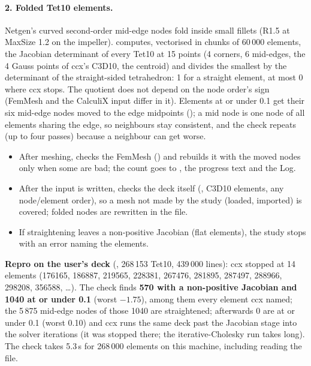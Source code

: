 \paragraph{2. Folded Tet10 elements.} Netgen's curved second-order mid-edge nodes fold inside small fillets (R1.5 at
MaxSize 1.2 on the impeller).  computes, vectorised in chunks of 60\,000 elements, the
Jacobian determinant of every Tet10 at 15 points (4 corners, 6 mid-edges, the 4 Gauss points of ccx's C3D10, the centroid) and
divides the smallest by the determinant of the straight-sided tetrahedron: 1 for a straight element, at most 0 where ccx stops.
The quotient does not depend on the node order's sign (FemMesh and the CalculiX input differ in it). Elements at or under 0.1
get their six mid-edge nodes moved to the edge midpoints (); a mid node is one node of all elements
sharing the edge, so neighbours stay consistent, and the check repeats (up to four passes) because a neighbour can get worse.
\begin{itemize}
  \item After meshing,  checks the FemMesh () and rebuilds it with the moved
        nodes only when some are bad; the count goes to , the progress text and the Log.
  \item After the input is written,  checks the deck itself (, C3D10 elements, any
        node/element order), so a mesh not made by the study (loaded, imported) is covered; folded nodes are rewritten in the file.
  \item If straightening leaves a non-positive Jacobian (flat elements), the study stops with an error naming the elements.
\end{itemize}
\textbf{Repro on the user's deck} (, 268\,153 Tet10, 439\,000 lines): ccx stopped at 14 elements
(176165, 186887, 219565, 228381, 267476, 281895, 287497, 288966, 298208, 356588, \ldots). The check finds \textbf{570 with a
non-positive Jacobian and 1040 at or under 0.1} (worst $-1.75$), among them every element ccx named; the 5\,875 mid-edge nodes
of those 1040 are straightened; afterwards 0 are at or under 0.1 (worst 0.10) and ccx runs the same deck past the Jacobian
stage into the solver iterations (it was stopped there; the iterative-Cholesky run takes long). The check takes 5.3\,s for 268\,000
elements on this machine, including reading the file.


